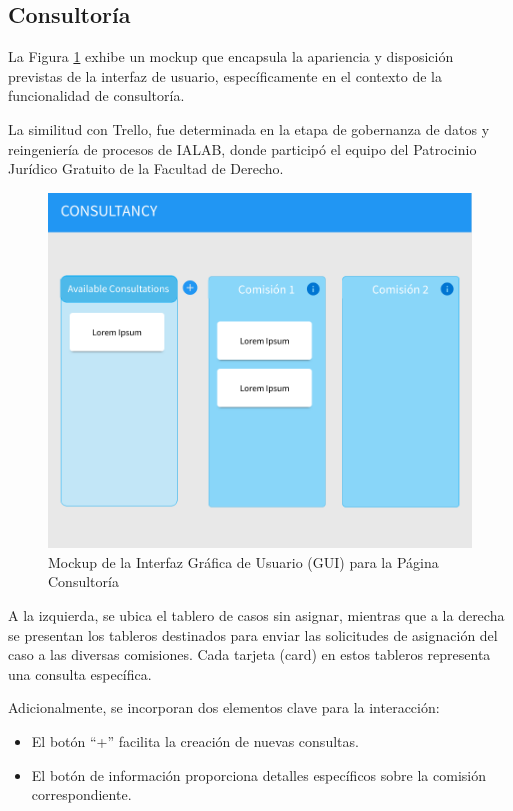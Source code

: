 \subsection{Consultoría}

La Figura \ref{fig:gui-consultancy} exhibe un mockup que encapsula la apariencia y disposición previstas de la interfaz de usuario, específicamente en el contexto de la funcionalidad de consultoría.

La similitud con Trello, fue determinada en la etapa de gobernanza de datos y reingeniería de procesos de IALAB, donde participó el equipo del Patrocinio Jurídico Gratuito de la Facultad de Derecho.

\begin{figure}[h]
\centering
\includegraphics[width=1\linewidth]{fig/GUI-consultancy.png}
\caption{Mockup de la Interfaz Gráfica de Usuario (GUI) para la Página Consultoría}
\label{fig:gui-consultancy}
\end{figure}


A la izquierda, se ubica el tablero de casos sin asignar, mientras que a la derecha se presentan los tableros destinados para enviar las solicitudes de asignación del caso a las diversas comisiones. Cada tarjeta (card) en estos tableros representa una consulta específica.

Adicionalmente, se incorporan dos elementos clave para la interacción:
\begin{itemize}
    \item El botón ``+''  facilita la creación de nuevas consultas.
    \item El botón de información proporciona detalles específicos sobre la comisión correspondiente.
\end{itemize}



